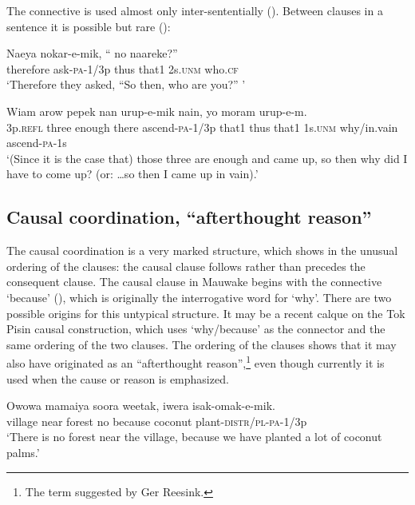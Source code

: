 The connective  is used almost only inter-sententially (). Between clauses in a sentence it is possible but rare ():

\ea%
\label{ex:x1905}
\gll Naeya  nokar-e-mik, ``    no  naareke?'' \\
therefore  ask-\textsc{pa}-1/3p  thus  that1  2s.\textsc{unm}  who.\textsc{cf}\\
\glt`Therefore they asked, ``So then, who are you?'' '
\z


\ea%
\label{ex:x1424}
\gll Wiam  arow  pepek  nan  urup-e-mik  nain,     yo  moram  urup-e-m. \\
3p.\textsc{refl} three  enough  there  ascend-\textsc{pa}-1/3p  that1 thus  that1  1s.\textsc{unm} why/in.vain ascend-\textsc{pa}-1s    \\
\glt`(Since it is the case that) those three are enough and came up, so then why did I have to come up? (or: {\dots}so then I came up in vain).'
\z


\subsection{Causal coordination, ``afterthought reason''}

The causal coordination is a very marked structure, which shows in the unusual ordering of the clauses: the causal clause follows rather than precedes the consequent clause. The causal clause in Mauwake begins with the connective  `because' (), which is originally the interrogative word for `why'.  There are two possible origins for this untypical structure. It may be a recent calque on the Tok Pisin causal construction, which uses  `why/because' as the connector and the same ordering of the two clauses. The ordering of the clauses shows that it may also have originated as an ``afterthought reason'',\footnote{The term suggested by Ger Reesink.} even though  currently it is used when the cause or reason is emphasized. 

\ea%
\label{ex:x1417}
\gll Owowa  mamaiya  soora  weetak,    iwera isak-omak-e-mik.\\
village  near  forest  no  because  coconut plant-\textsc{distr}/\textsc{pl}-\textsc{pa}-1/3p\\
\glt`There is no forest near the village, because we have planted a lot of coconut palms.'
\z


